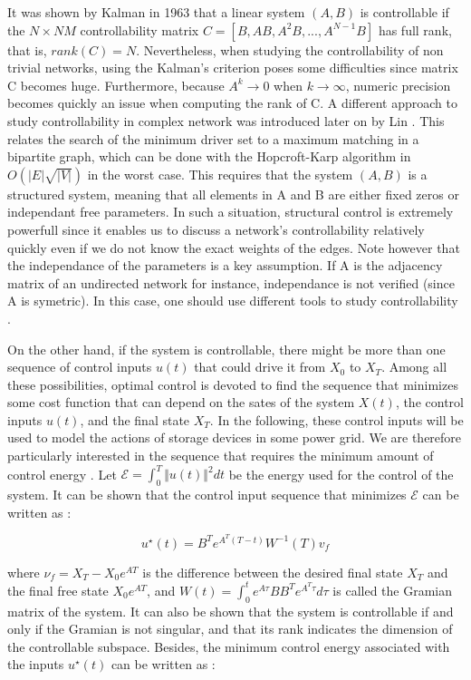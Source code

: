 \documentclass[conference]{IEEEtran}
\begin{document}
It was shown by Kalman in 1963 that a linear system $(A,B)$ is controllable if the $N \times NM $ controllability matrix $ C = [B,AB,A^2B,...,A^{N-1}B] $ has full rank, that is, $rank(C) = N$. Nevertheless, when studying the controllability of non trivial networks, using the Kalman's criterion poses some difficulties since matrix C becomes huge. Furthermore, because $A^k\longrightarrow 0$ when $k\longrightarrow \infty $, numeric precision becomes quickly an issue when computing the rank of C. A different approach to study controllability in complex network was introduced later on by Lin \cite{1100557}. This relates the search of the minimum driver set to a maximum matching in a bipartite graph, which can be done with the Hopcroft-Karp algorithm in $ O(|E|\sqrt{|V|}) $ in the worst case. This requires that the system $(A,B)$ is a structured system, meaning that all elements in A and B are either fixed zeros or independant free parameters. In such a situation, structural control is extremely powerfull since it enables us to discuss a network's controllability relatively quickly even if we do not know the exact weights of the edges. Note however that the independance of the parameters is a key assumption. If A is the adjacency matrix of an undirected network for instance, independance is not verified (since A is symetric). In this case, one should use different tools to study controllability \cite{Yuan2014}. 

On the other hand, if the system is controllable, there might be more than one sequence of control inputs $u(t)$ that could drive it from $X_0$ to $X_T$. Among all these possibilities, optimal control is devoted to find the sequence that minimizes some cost function that can depend on the sates of the system $X(t)$, the control inputs $u(t)$, and the final state $X_T$. In the following, these control inputs will be used to model the actions of storage devices in some power grid. We are therefore particularly interested in the sequence that requires the minimum amount of control energy \cite{Yan2012}. Let $ \mathcal{E} = \int_{0}^{T} \Vert u(t) \Vert^2 dt $ be the energy used for the control of the system. It can be shown \cite{Liu2015} that the control input sequence that minimizes $ \mathcal{E} $ can be written as :


\begin{equation}
\label{eq:ustar}
 u^{\star}(t) = B^{T}e^{ A^{T}(T-t) } W^{-1}(T) v_f 
\end{equation}


where $ \nu_f = X_T - X_0 e^{AT} $ is the difference between the desired final state $X_T$ and the final free state $X_0 e^{AT} $, and $W(t) = \int_{0}^{t} e^{A \tau}BB^{T} e^{A^{T} \tau} d\tau $ is called the Gramian matrix of the system. It can also be shown that the system is controllable if and only if the Gramian is not singular, and that its rank indicates the dimension of the controllable subspace. Besides, the minimum control energy associated with the inputs $ u^{\star}(t)$ can be written as :
\end{document}

